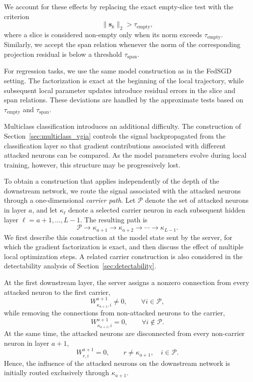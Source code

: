 We account for these effects by replacing the exact empty-slice test with
the criterion
\[
    \|\mathbf{s}_k\|_2 > \tau_{\mathrm{empty}},
\]
where a slice is considered non-empty only when its norm exceeds
$\tau_{\mathrm{empty}}$. Similarly, we accept the span relation whenever
the norm of the corresponding projection residual is below a threshold
$\tau_{\mathrm{span}}$.

For regression tasks, we use the same model construction as in the FedSGD
setting. The factorization is exact at the beginning of the local
trajectory, while subsequent local parameter updates introduce residual
errors in the slice and span relations. These deviations are handled by
the approximate tests based on $\tau_{\mathrm{empty}}$ and
$\tau_{\mathrm{span}}$.

Multiclass classification introduces an additional difficulty. The
construction of Section~\ref{sec:multiclass_vgia} controls the signal
backpropagated from the classification layer so that gradient contributions
associated with different attacked neurons can be compared. As the model
parameters evolve during local training, however, this structure may be
progressively lost.

To obtain a construction that applies independently of the depth of the
downstream network, we route the signal associated with the attacked
neurons through a one-dimensional \emph{carrier path}. Let
$\mathcal P$ denote the set of attacked neurons in layer $a$, and let
$\kappa_\ell$ denote a selected carrier neuron in each subsequent hidden
layer $\ell=a+1,\ldots,L-1$. The resulting path is
\[
    \mathcal P
    \longrightarrow
    \kappa_{a+1}
    \longrightarrow
    \kappa_{a+2}
    \longrightarrow
    \cdots
    \longrightarrow
    \kappa_{L-1}.
\]
We first describe this construction at the model state sent by the server,
for which the gradient factorization is exact, and then discuss the effect
of multiple local optimization steps. A related carrier construction is
also considered in the detectability analysis of
Section~\ref{sec:detectability}.

At the first downstream layer, the server assigns a nonzero connection
from every attacked neuron to the first carrier,
\[
    W^{a+1}_{\kappa_{a+1},i}\neq 0,
    \qquad \forall i\in\mathcal P,
\]
while removing the connections from non-attacked neurons to the carrier,
\[
    W^{a+1}_{\kappa_{a+1},i}=0,
    \qquad \forall i\notin\mathcal P.
\]
At the same time, the attacked neurons are disconnected from every
non-carrier neuron in layer $a+1$,
\[
    W^{a+1}_{r,i}=0,
    \qquad
    r\neq\kappa_{a+1},\quad i\in\mathcal P.
\]
Hence, the influence of the attacked neurons on the downstream network is
initially routed exclusively through $\kappa_{a+1}$.

